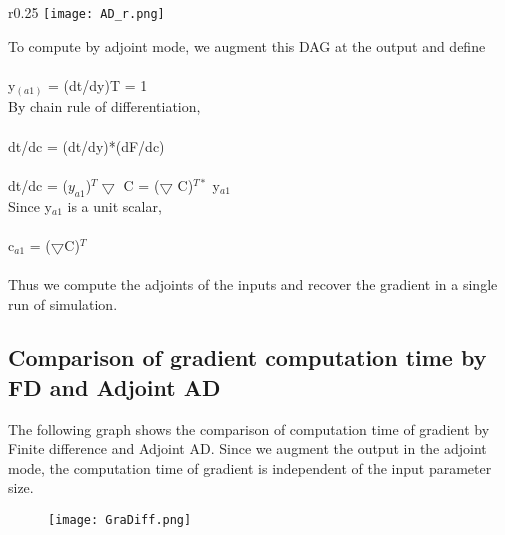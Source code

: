 \documentclass[10pt,a4paper]{report}
\begin{document}
\begin{wrapfigure}{r}{0.25\textwidth} %
    \centering
    \texttt{[image: AD\_r.png]}
    \caption{}
    \label{AD_r}
\end{wrapfigure}

To compute by adjoint mode, we augment this DAG at the output and define\\
\\
y$_{(a1)}$ = (dt/dy)T = 1\\

By chain rule of differentiation,\\
\\
dt/dc = (dt/dy)*(dF/dc)\\
\\
dt/dc = ($y_{a1}$)$^{T} \bigtriangledown $ C = ($\bigtriangledown$ C)$^{T*}$ y$_{a1}$\\ 

Since y$_{a1}$ is a unit scalar,\\
\\
c$_{a1}$  = ($\bigtriangledown$C)$^T$\\
\\
Thus we compute the adjoints of the inputs and recover the gradient in  a single run of simulation.


\subsection{Comparison of gradient computation time by FD and Adjoint AD}


The following graph shows the comparison of computation time of gradient by Finite difference and Adjoint AD. Since we augment the output in the adjoint mode, the computation time of gradient is independent of the input parameter size.



\begin{figure}[H]
\begin{center}
\texttt{[image: GraDiff.png]} 
\caption{}
\label{fig:GradDiff}
\end{center}
\end{figure}
\end{document}
